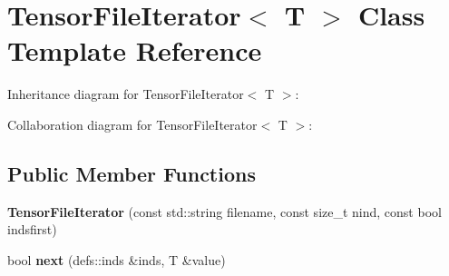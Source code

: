 \hypertarget{classTensorFileIterator}{}\section{Tensor\+File\+Iterator$<$ T $>$ Class Template Reference}
\label{classTensorFileIterator}


Inheritance diagram for Tensor\+File\+Iterator$<$ T $>$\+:


Collaboration diagram for Tensor\+File\+Iterator$<$ T $>$\+:
\subsection*{Public Member Functions}
\begin{DoxyCompactItemize}
\item 
{\bfseries Tensor\+File\+Iterator} (const std\+::string filename, const size\+\_\+t nind, const bool indsfirst)\hypertarget{classTensorFileIterator_a5c8541d7ea6d3fca48a919f97dd8d636}{}\label{classTensorFileIterator_a5c8541d7ea6d3fca48a919f97dd8d636}

\item 
bool {\bfseries next} (defs\+::inds \&inds, T \&value)\hypertarget{classTensorFileIterator_ad623998d768fa6c788df182b2ab04b02}{}\label{classTensorFileIterator_ad623998d768fa6c788df182b2ab04b02}

\end{DoxyCompactItemize}
